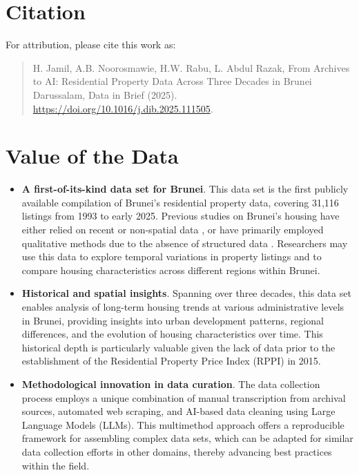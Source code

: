 \documentclass[
  number]{elsarticle}
\begin{document}
\section{Citation}\label{citation}

For attribution, please cite this work as:

\begin{quote}
H. Jamil, A.B. Noorosmawie, H.W. Rabu, L. Abdul Razak, From Archives to
AI: Residential Property Data Across Three Decades in Brunei Darussalam,
Data in Brief (2025). \url{https://doi.org/10.1016/j.dib.2025.111505}.
\end{quote}

\section{Value of the Data}\label{value-of-the-data}

\begin{itemize}
\item
  \textbf{A first-of-its-kind data set for Brunei}. This data set is the
  first publicly available compilation of Brunei's residential property
  data, covering 31,116 listings from 1993 to early 2025. Previous
  studies on Brunei's housing have either relied on recent or
  non-spatial data \citep{ng2022characterising, jamil2025leveraging}, or
  have primarily employed qualitative methods due to the absence of
  structured data \citep{hassan2011cultural, hassan2023sociocultural}.
  Researchers may use this data to explore temporal variations in
  property listings and to compare housing characteristics across
  different regions within Brunei.
\item
  \textbf{Historical and spatial insights}. Spanning over three decades,
  this data set enables analysis of long-term housing trends at various
  administrative levels in Brunei, providing insights into urban
  development patterns, regional differences, and the evolution of
  housing characteristics over time. This historical depth is
  particularly valuable given the lack of data prior to the
  establishment of the Residential Property Price Index (RPPI)
  \citep{bdcb2021technical} in 2015.
\item
  \textbf{Methodological innovation in data curation}. The data
  collection process employs a unique combination of manual
  transcription from archival sources, automated web scraping, and
  AI-based data cleaning using Large Language Models (LLMs). This
  multimethod approach offers a reproducible framework for assembling
  complex data sets, which can be adapted for similar data collection
  efforts in other domains, thereby advancing best practices within the
  field.
\end{itemize}
\end{document}

